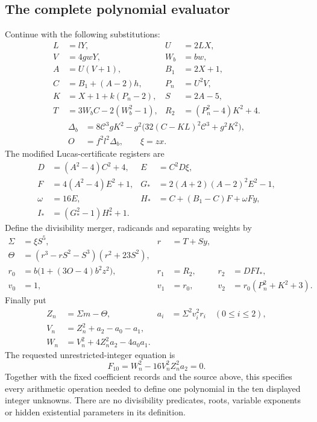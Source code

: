 \subsection{The complete polynomial evaluator}

Continue with the following substitutions:
\begin{align*}
 L&=lY,&U&=2LX,\\
 V&=4gwY,&W_b&=bw,\\
 A&=U(V+1),&B_1&=2X+1,\\
 C&=B_1+(A-2)h,&P_n&=U^2V,\\
 K&=X+1+k(P_n-2),&S&=2A-5,\\
 T&=3W_bC-2(W_b^2-1),&R_2&=(P_n^2-4)K^2+4.
\end{align*}
\begin{align*}
 \Delta_b&=8\mathcal C^3gK^2
       -g^2\bigl(32(C-KL)^2\mathcal C^3+g^2K^2\bigr),\\
 O&=f^2l^2\Delta_b,\qquad \xi=zx.
\end{align*}
The modified Lucas-certificate registers are
\begin{align*}
 D&=(A^2-4)C^2+4,&E&=C^2D\xi,\\
 F&=4(A^2-4)E^2+1,&G_*&=2(A+2)(A-2)^2E^2-1,\\
 \omega&=16E,&H_*&=C+(B_1-C)F+\omega Fy,\\
 I_*&=(G_*^2-1)H_*^2+1.
\end{align*}
Define the divisibility merger, radicands and separating weights by
\begin{align*}
 \Sigma&=\xi S^5,&r&=T+Sy,\\
 \Theta&=(r^3-rS^2-S^3)(r^2+23S^2),\\
 r_0&=b\bigl(1+(3O-4)b^2z^2\bigr),&
 r_1&=R_2,&r_2&=DFI_*,\\
 v_0&=1,&v_1&=r_0,&v_2&=r_0(P_n^2+K^2+3).
\end{align*}
Finally put
\begin{align*}
 Z_n&=\Sigma m-\Theta,&a_i&=\Sigma^2v_i^2r_i\quad(0\le i\le2),\\
 V_n&=Z_n^2+a_2-a_0-a_1,\\
 W_n&=V_n^2+4Z_n^2a_2-4a_0a_1.
\end{align*}
The requested unrestricted-integer equation is
\begin{equation}\label{eq:F10}
 \boxed{F_{10}=W_n^2-16V_n^2Z_n^2a_2=0.}
\end{equation}
Together with the fixed coefficient records and the source above, this
specifies every arithmetic operation needed to define one polynomial
in the ten displayed integer unknowns. There are no divisibility
predicates, roots, variable exponents or hidden existential parameters
in its definition.

